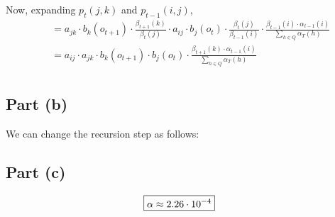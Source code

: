 \documentclass[11pt,a4paper,titlepage]{article}
\begin{document}
Now, expanding $p_t(j, k)$ and $p_{t-1}(i, j)$,
\begin{align*}
    ~~ &= a_{jk} \cdot b_k(o_{t+1}) \cdot \frac{\beta_{t+1}(k)}{\beta_t(j)} \cdot
          a_{ij} \cdot b_j(o_t) \cdot \frac{\beta_t(j)}{\beta_{t-1}(i)} \cdot
          \frac{\beta_{t-1}(i) \cdot \alpha_{t-1}(i)}{\sum_{h \in Q}\alpha_T(h)} \\
       &= a_{ij} \cdot a_{jk} \cdot b_k(o_{t+1}) \cdot b_j(o_t) \cdot
          \frac{\beta_{t+1}(k) \cdot \alpha_{t-1}(i)}{\sum_{h \in Q}\alpha_T(h)} \\
\end{align*}

\subsection*{Part (b)}

We can change the recursion step as follows:

\subsection*{Part (c)}
\begin{align*}
\Aboxed{\alpha \approx 2.26 \cdot 10^{-4}}
\end{align*}

\end{document}

